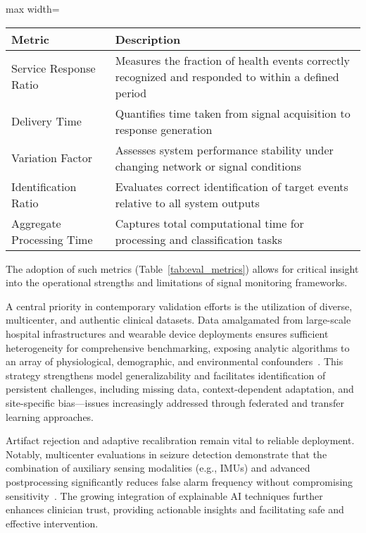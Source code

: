 \documentclass[sigconf]{acmart}
\begin{document}
\begin{table*}[htbp]
\centering
\caption{Representative Metrics for Evaluating Real-Time Health Monitoring Systems}
\label{tab:eval_metrics}
\begin{adjustbox}{max width=\textwidth}
\begin{tabular}{ll}
\toprule
\textbf{Metric} & \textbf{Description} \\
\midrule
Service Response Ratio & Measures the fraction of health events correctly recognized and responded to within a defined period \\
Delivery Time & Quantifies time taken from signal acquisition to response generation \\
Variation Factor & Assesses system performance stability under changing network or signal conditions \\
Identification Ratio & Evaluates correct identification of target events relative to all system outputs \\
Aggregate Processing Time & Captures total computational time for processing and classification tasks \\
\bottomrule
\end{tabular}
\end{adjustbox}
\end{table*}

The adoption of such metrics (Table~\ref{tab:eval_metrics}) allows for critical insight into the operational strengths and limitations of signal monitoring frameworks.

A central priority in contemporary validation efforts is the utilization of diverse, multicenter, and authentic clinical datasets. Data amalgamated from large-scale hospital infrastructures and wearable device deployments ensures sufficient heterogeneity for comprehensive benchmarking, exposing analytic algorithms to an array of physiological, demographic, and environmental confounders~\cite{ref77,ref80,ref84,ref89,ref90,ref103,ref107}. This strategy strengthens model generalizability and facilitates identification of persistent challenges, including missing data, context-dependent adaptation, and site-specific bias—issues increasingly addressed through federated and transfer learning approaches.

Artifact rejection and adaptive recalibration remain vital to reliable deployment. Notably, multicenter evaluations in seizure detection demonstrate that the combination of auxiliary sensing modalities (e.g., IMUs) and advanced postprocessing significantly reduces false alarm frequency without compromising sensitivity~\cite{ref103}. The growing integration of explainable AI techniques further enhances clinician trust, providing actionable insights and facilitating safe and effective intervention.
\end{document}
